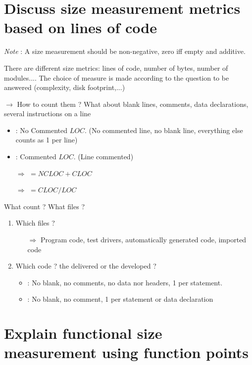 \section{Discuss size measurement metrics based on lines of code}

\textit{Note} : A size measurement should be non-negative, zero iff empty and additive.

There are different size metrics: lines of code, number of bytes, number of modules.... The choice of measure is made according to the question to be answered (complexity, disk footprint,...)

 $\rightarrow$ How to count them ? What about blank lines, comments, data declarations, several instructions on a line
\begin{itemize}
    \item {} : No Commented $LOC$. (No commented line, no blank line, everything else counts as 1 per line)
    \item {}: Commented $LOC$. (Line commented)
    \item [$\Rightarrow$]  $= NCLOC + CLOC$
    \item [$\Rightarrow$]  $= CLOC / LOC$
\end{itemize}
\noindent What count ? What files ? 
\begin{enumerate}
    \item Which files ? 
    \begin{itemize}
        \item [$\Rightarrow$]Program code, test drivers, automatically generated code, imported code
    \end{itemize}
    \item Which code ? the delivered or the developed ?
    \begin{itemize}
        \item {} : No blank, no comments, no data nor headers, 1 per statement.
        \item {} : No blank, no comment, 1 per statement or data declaration
    \end{itemize}
\end{enumerate}

\section{Explain functional size measurement using function points}

